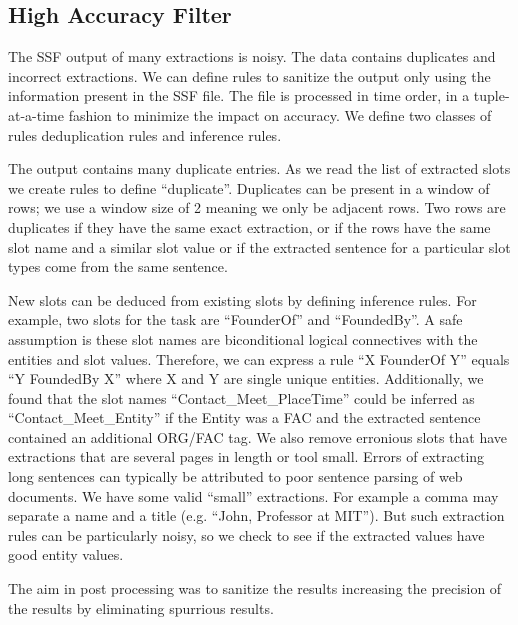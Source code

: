 \subsection{High Accuracy Filter}

The SSF output of many extractions is noisy. The data contains duplicates and 
incorrect extractions. We can define rules to sanitize the output only using 
the information present in the SSF file. The file is processed in time order, 
in a tuple-at-a-time fashion to minimize the impact on accuracy. We define 
two classes of rules deduplication rules and inference rules.

The output contains many duplicate entries. As we read the list of extracted 
slots we create rules to define ``duplicate''. Duplicates can be present in a 
window of rows; we use a window size of 2 meaning we only be adjacent rows. 
Two rows are duplicates if they have the same exact extraction, or if the 
rows have the same slot name and a similar slot value or if the extracted 
sentence for a particular slot types come from the same sentence.

 New slots can be deduced from existing slots by defining inference rules. 
 For example, two slots for the task are ``FounderOf'' and ``FoundedBy''. A safe 
 assumption is these slot names are biconditional logical connectives with the 
 entities and slot values. Therefore, we can express a rule ``X FounderOf Y'' 
 equals ``Y FoundedBy X'' where X and Y are single unique entities. Additionally,
 we found that the slot names ``Contact\_Meet\_PlaceTime'' could be inferred as
 ``Contact\_Meet\_Entity'' if the Entity was a FAC and the extracted sentence 
 contained an additional ORG/FAC tag.  
We also remove erronious slots that have extractions that are several pages in 
length or tool small. Errors of extracting long sentences can typically be 
attributed to poor sentence parsing of web documents. We have some valid
``small'' extractions. For example a comma may separate a name and a title
(e.g. ``John, Professor at MIT''). But such extraction rules can be particularly 
noisy, so we check to see if the extracted values have good entity values.

The aim in post processing was to sanitize the results increasing the 
precision of the results by eliminating spurrious results.





